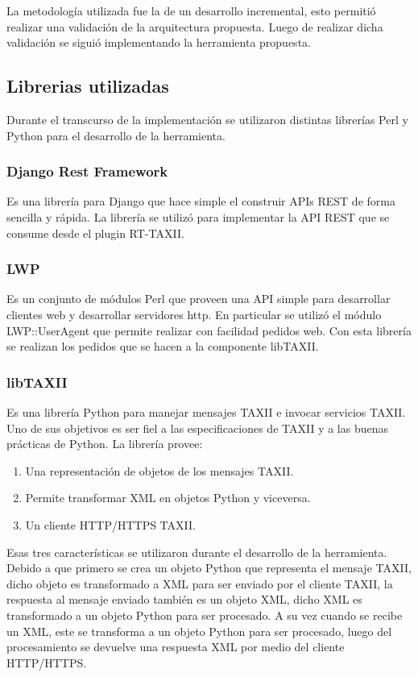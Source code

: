 \documentclass[11pt]{article}
\begin{document}
La metodología utilizada fue la de un desarrollo incremental, esto permitió realizar una validación de la arquitectura propuesta. Luego de realizar dicha validación se siguió implementando la herramienta propuesta.

\subsection{Librerias utilizadas}
Durante el transcurso de la implementación se utilizaron distintas librerías Perl y Python para el desarrollo de la herramienta.

\subsubsection{Django Rest Framework}
Es una librería para Django que hace simple el construir APIs REST de forma sencilla y rápida. La librería se utilizó para implementar la API REST que se consume desde el plugin RT-TAXII.

\subsubsection{LWP}
Es un conjunto de módulos Perl que proveen una API simple para desarrollar clientes web y desarrollar servidores http. En particular se utilizó el módulo LWP::UserAgent que permite realizar con facilidad pedidos web.
Con esta librería se realizan los pedidos que se hacen a la componente  libTAXII.

\subsubsection{libTAXII}
Es una librería Python para manejar mensajes TAXII e invocar servicios TAXII. Uno de sus objetivos es ser fiel a las especificaciones de TAXII y a las buenas prácticas de Python.
La librería provee:

\begin{enumerate}
	\item
	Una representación de objetos de los mensajes TAXII.
	\item
	Permite transformar XML en objetos Python y viceversa.
	\item
	Un cliente HTTP/HTTPS TAXII.
\end{enumerate}

Esas tres características se utilizaron durante el desarrollo de la herramienta. Debido a que primero se crea un objeto Python que representa el mensaje TAXII, dicho objeto es transformado a XML para ser enviado por el cliente TAXII, la respuesta al mensaje enviado también es un objeto XML, dicho XML es transformado a un objeto Python para ser procesado.
A su vez cuando se recibe un XML, este se transforma a un objeto Python para ser procesado, luego del procesamiento se devuelve una respuesta XML por medio del cliente HTTP/HTTPS.
\end{document}
